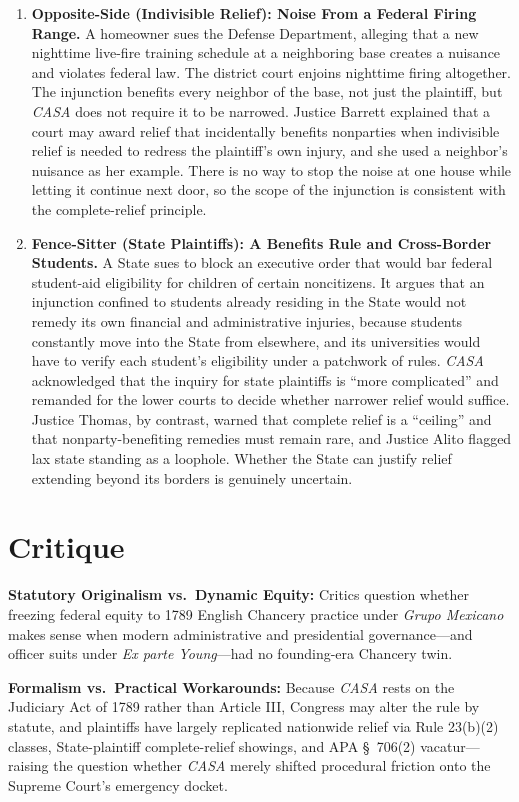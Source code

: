 \documentclass[12pt]{article}
\begin{document}
\begin{enumerate}
\item \textbf{Opposite-Side (Indivisible Relief): Noise From a Federal Firing Range.} A homeowner sues the Defense Department, alleging that a new nighttime live-fire training schedule at a neighboring base creates a nuisance and violates federal law. The district court enjoins nighttime firing altogether. The injunction benefits every neighbor of the base, not just the plaintiff, but \textit{CASA} does not require it to be narrowed. Justice Barrett explained that a court may award relief that incidentally benefits nonparties when indivisible relief is needed to redress the plaintiff's own injury, and she used a neighbor's nuisance as her example. There is no way to stop the noise at one house while letting it continue next door, so the scope of the injunction is consistent with the complete-relief principle.

\item \textbf{Fence-Sitter (State Plaintiffs): A Benefits Rule and Cross-Border Students.} A State sues to block an executive order that would bar federal student-aid eligibility for children of certain noncitizens. It argues that an injunction confined to students already residing in the State would not remedy its own financial and administrative injuries, because students constantly move into the State from elsewhere, and its universities would have to verify each student's eligibility under a patchwork of rules. \textit{CASA} acknowledged that the inquiry for state plaintiffs is ``more complicated'' and remanded for the lower courts to decide whether narrower relief would suffice. Justice Thomas, by contrast, warned that complete relief is a ``ceiling'' and that nonparty-benefiting remedies must remain rare, and Justice Alito flagged lax state standing as a loophole. Whether the State can justify relief extending beyond its borders is genuinely uncertain.

\end{enumerate}

\section{Critique}
\textbf{Statutory Originalism vs.\ Dynamic Equity:} Critics question whether freezing federal equity to 1789 English Chancery practice under \textit{Grupo Mexicano} makes sense when modern administrative and presidential governance---and officer suits under \textit{Ex parte Young}---had no founding-era Chancery twin.

\textbf{Formalism vs.\ Practical Workarounds:} Because \textit{CASA} rests on the Judiciary Act of 1789 rather than Article III, Congress may alter the rule by statute, and plaintiffs have largely replicated nationwide relief via Rule 23(b)(2) classes, State-plaintiff complete-relief showings, and APA \S\ 706(2) vacatur---raising the question whether \textit{CASA} merely shifted procedural friction onto the Supreme Court's emergency docket.
\end{document}
